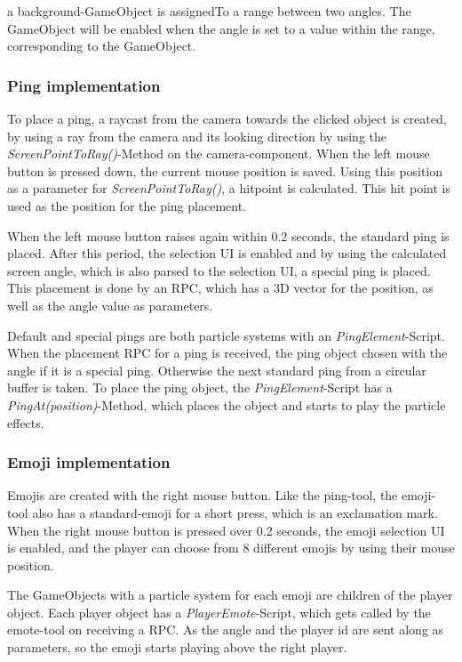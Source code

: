 a background-GameObject is assignedTo a range between two angles. The GameObject will be enabled when the angle is set to a value within the range, corresponding to the GameObject.



\subsubsection{Ping implementation}

To place a ping, a raycast from the camera towards the clicked object is created, by using a ray from the camera and its looking direction by using the \textit{ScreenPointToRay()}-Method on the camera-component. When the left mouse button is pressed down, the current mouse position is saved. Using this position as a parameter for \textit{ScreenPointToRay()}, a hitpoint is calculated. This hit point is used as the position for the ping placement.

When the left mouse button raises again within 0.2 seconds, the standard ping is placed. After this period, the selection UI is enabled and by using the calculated screen angle, which is also parsed to the selection UI, a special ping is placed. This placement is done by an RPC, which has a 3D vector for the position, as well as the angle value as parameters.

Default and special pings are both particle systems with an \textit{PingElement}-Script.
When the placement RPC for a ping is received, the ping object chosen with the angle if it is a special ping. Otherwise the next standard ping from a circular buffer is taken. To place the ping object, the \textit{PingElement}-Script has a \textit{PingAt(position)}-Method, which places the object and starts to play the particle effects.

\subsubsection{Emoji implementation}

Emojis are created with the right mouse button. Like the ping-tool, the emoji-tool also has a standard-emoji for a short press, which is an exclamation mark.
When the right mouse button is pressed over 0.2 seconds, the emoji selection UI is enabled, and the player can choose from 8 different emojis by using their mouse position.

The GameObjects with a particle system for each emoji are children of the player object.
Each player object has a \textit{PlayerEmote}-Script, which gets called by the emote-tool on receiving a RPC. As the angle and the player id are sent along as parameters, so the emoji starts playing above the right player.

